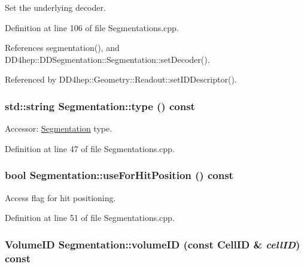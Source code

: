 Set the underlying decoder. 

Definition at line 106 of file Segmentations.cpp.

References segmentation(), and DD4hep::DDSegmentation::Segmentation::setDecoder().

Referenced by DD4hep::Geometry::Readout::setIDDescriptor().\hypertarget{class_d_d4hep_1_1_geometry_1_1_segmentation_af56809ba4916a75514d320b5c74329d7}{
\subsubsection[{type}]{\setlength{\rightskip}{0pt plus 5cm}std::string Segmentation::type () const}}
\label{class_d_d4hep_1_1_geometry_1_1_segmentation_af56809ba4916a75514d320b5c74329d7}


Accessor: \hyperlink{class_d_d4hep_1_1_geometry_1_1_segmentation}{Segmentation} type. 

Definition at line 47 of file Segmentations.cpp.\hypertarget{class_d_d4hep_1_1_geometry_1_1_segmentation_a3cf42d5fcbc3e68a8b4854145c9381e4}{
\subsubsection[{useForHitPosition}]{\setlength{\rightskip}{0pt plus 5cm}bool Segmentation::useForHitPosition () const}}
\label{class_d_d4hep_1_1_geometry_1_1_segmentation_a3cf42d5fcbc3e68a8b4854145c9381e4}


Access flag for hit positioning. 

Definition at line 51 of file Segmentations.cpp.\hypertarget{class_d_d4hep_1_1_geometry_1_1_segmentation_a2e3c79064485c1811870d9d6b44b002b}{
\subsubsection[{volumeID}]{\setlength{\rightskip}{0pt plus 5cm}VolumeID Segmentation::volumeID (const CellID \& {\em cellID}) const}}
\label{class_d_d4hep_1_1_geometry_1_1_segmentation_a2e3c79064485c1811870d9d6b44b002b}


